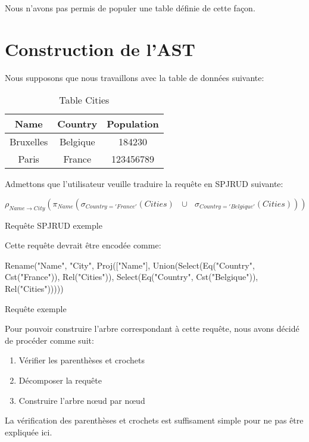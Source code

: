 \documentclass[]{article}
\begin{document}
Nous n'avons pas permis de populer une table d\'efinie de cette fa\c{c}on.

\section{Construction de l'AST}

Nous supposons que nous travaillons avec la table de donn\'ees suivante:

\begin{table}[H]
	\centering
	\begin{tabular}{| c | c | c |}
		\hline
		\textbf{Name} & \textbf{Country} & \textbf{Population} \\
		\hline
		Bruxelles & Belgique & 184230\\
		\hline
		Paris & France & 123456789\\
		\hline
	\end{tabular}
	\caption{Table Cities}
	\label{Cities}
\end{table}

Admettons que l'utilisateur veuille traduire la requ\^ete en SPJRUD suivante:

\begin{request}[H]
	\centering
	$\rho_{Name \to City}(\pi_{Name}(\sigma_{Country='France'}(Cities) \text{ } \cup \text{ } \sigma_{Country='Belgique'}(Cities)))$
	\caption{Requête SPJRUD exemple}
\end{request}

Cette requ\^ete devrait \^etre encod\'ee comme:

\begin{request}[H]
	\centering
		Rename("Name", "City", Proj(["Name"], Union(Select(Eq("Country", Cst("France")), Rel("Cities")), Select(Eq("Country", Cst("Belgique")), Rel("Cities")))))
	\caption{Requête exemple}
	\label{exemple}
\end{request}

Pour pouvoir construire l'arbre correspondant \`a cette requ\^ete, nous avons d\'ecid\'e de proc\'eder comme suit:

\begin{enumerate}
	\item V\'erifier les parenth\`eses et crochets
	\item D\'ecomposer la requ\^ete
	\item Construire l'arbre n\oe{}ud par n\oe{}ud
\end{enumerate}

La v\'erification des parenth\`eses et crochets est suffisament simple pour ne pas \^etre expliqu\'ee ici.
\end{document}
